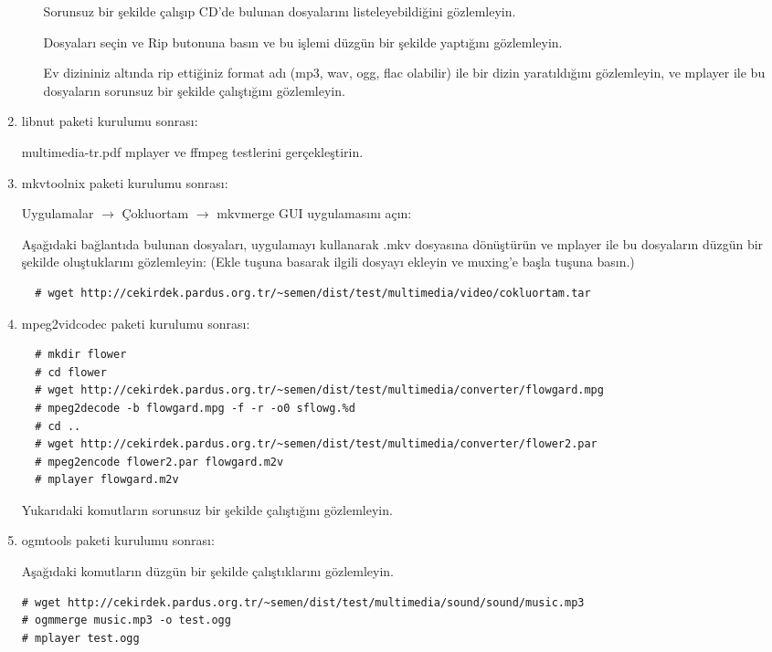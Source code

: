 \documentclass[a4paper,10pt]{article}
\begin{document}
\begin{enumerate}
\begin{itemize}
Sorunsuz bir şekilde çalışıp CD'de bulunan dosyalarını listeleyebildiğini gözlemleyin.

Dosyaları seçin ve Rip butonuna basın ve bu işlemi düzgün bir şekilde yaptığını gözlemleyin.

Ev dizininiz altında rip ettiğiniz format adı (mp3, wav, ogg, flac olabilir) ile bir dizin yaratıldığını gözlemleyin, ve mplayer ile bu dosyaların sorunsuz bir şekilde çalıştığını gözlemleyin.
\end{itemize}

\item libnut paketi kurulumu sonrası:

multimedia-tr.pdf mplayer ve ffmpeg testlerini gerçekleştirin.

\item mkvtoolnix paketi kurulumu sonrası:

Uygulamalar $\rightarrow$ Çokluortam $\rightarrow$ mkvmerge GUI uygulamasını açın:

Aşağıdaki bağlantıda bulunan dosyaları, uygulamayı kullanarak .mkv dosyasına dönüştürün ve mplayer ile bu dosyaların düzgün bir şekilde oluştuklarını gözlemleyin: (Ekle tuşuna basarak ilgili dosyayı ekleyin ve muxing'e başla tuşuna basın.)
\begin{verbatim}
  # wget http://cekirdek.pardus.org.tr/~semen/dist/test/multimedia/video/cokluortam.tar
 \end{verbatim}

\item mpeg2vidcodec paketi kurulumu sonrası:
\begin{verbatim}
  # mkdir flower
  # cd flower
  # wget http://cekirdek.pardus.org.tr/~semen/dist/test/multimedia/converter/flowgard.mpg
  # mpeg2decode -b flowgard.mpg -f -r -o0 sflowg.%d
  # cd ..
  # wget http://cekirdek.pardus.org.tr/~semen/dist/test/multimedia/converter/flower2.par
  # mpeg2encode flower2.par flowgard.m2v
  # mplayer flowgard.m2v
\end{verbatim}

Yukarıdaki komutların sorunsuz bir şekilde çalıştığını gözlemleyin.
\item ogmtools paketi kurulumu sonrası:

Aşağıdaki komutların düzgün bir şekilde çalıştıklarını gözlemleyin.
\begin{verbatim}
# wget http://cekirdek.pardus.org.tr/~semen/dist/test/multimedia/sound/sound/music.mp3 
# ogmmerge music.mp3 -o test.ogg
# mplayer test.ogg
\end{verbatim}


\end{enumerate}
\end{document}
